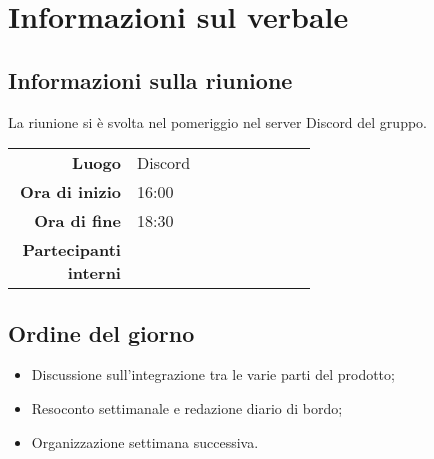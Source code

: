\section{Informazioni sul verbale}

\subsection{Informazioni sulla riunione}
La riunione si è svolta nel pomeriggio nel server Discord del gruppo.

\begin{center}
	\begin{tabular}{r|p{0.6\linewidth}}
		\toprule
		\textbf{Luogo} & Discord \\
		\textbf{Ora di inizio} & 16:00 \\
		\textbf{Ora di fine} & 18:30 \\
		\textbf{Partecipanti interni} & \groupTeam
	\end{tabular}
\end{center}

\medskip

\subsection{Ordine del giorno}
\begin{itemize}
	\item Discussione sull'integrazione tra le varie parti del prodotto;
	\item Resoconto settimanale e redazione diario di bordo;
	\item Organizzazione settimana successiva.
\end{itemize}